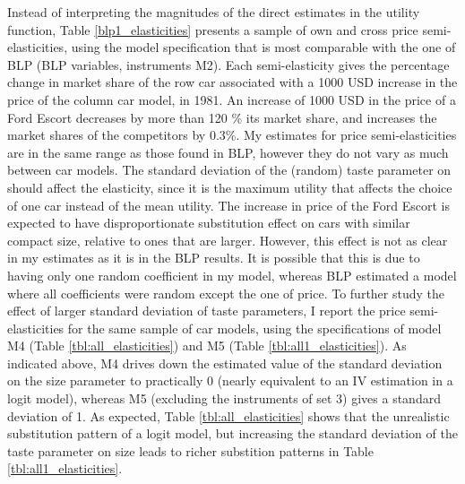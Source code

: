 \documentclass{article}\usepackage[]{graphicx}\usepackage[]{color}
\begin{document}
%
Instead of interpreting the magnitudes of the direct estimates in the utility function, Table \ref{blp1_elasticities} presents a sample of  own and cross price semi-elasticities, using the model specification that is most comparable with the one of BLP (BLP variables, instruments M2). Each semi-elasticity gives the percentage change in market share of the row car associated with a 1000 USD increase in the price of the column car model, in 1981. An increase of 1000 USD in the price of a Ford Escort decreases by more than 120 \% its market share, and increases the market shares of the competitors by 0.3\%. My estimates for price semi-elasticities are in the same range as those found in BLP, however they do not vary as much between car models. The standard deviation of the (random) taste parameter on should affect the elasticity, since it is the maximum utility that affects the choice of one car instead of the mean utility. The increase in price of the Ford Escort is expected to have disproportionate substitution effect on cars with similar compact size, relative to ones that are larger. However, this effect is not as clear in my estimates as it is in the BLP results. It is possible that this is due to having only one random coefficient in my model, whereas BLP estimated a model where all coefficients were random except the one of price. To further study the effect of larger standard deviation of taste parameters, I report the price semi-elasticities for the same sample of car models, using the specifications of model M4 (Table \ref{tbl:all_elasticities}) and M5 (Table \ref{tbl:all1_elasticities}). As indicated above, M4 drives down the estimated value of the standard deviation on the size parameter to practically 0 (nearly equivalent to an IV estimation in a logit model), whereas M5 (excluding the instruments of set 3) gives a standard deviation of 1. As expected, Table \ref{tbl:all_elasticities} shows that the unrealistic substitution pattern of a logit model, but increasing the standard deviation of the taste parameter on size leads to richer substition patterns in Table \ref{tbl:all1_elasticities}.

%

%
\end{document}
